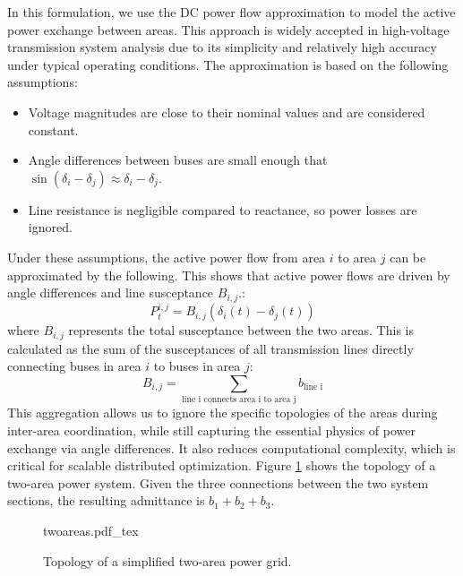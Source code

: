 \documentclass{article}
\newcommand{\incfig}[1]{%
    \def\svgwidth{\columnwidth}
    {#1.pdf_tex}
}
\begin{document}
In this formulation, we use the DC power flow approximation to model the active power exchange between areas. This approach is widely accepted in high-voltage transmission system analysis due to its simplicity and relatively high accuracy under typical operating conditions. The approximation is based on the following assumptions:
\begin{itemize}
    \item Voltage magnitudes are close to their nominal values and are considered constant.
    \item Angle differences between buses are small enough that $\sin(\delta_i - \delta_j) \approx \delta_i - \delta_j$.
    \item Line resistance is negligible compared to reactance, so power losses are ignored.
\end{itemize}
Under these assumptions, the active power flow from area $i$ to area $j$ can be approximated by the following. This shows that active power flows are driven by angle differences and line susceptance $B_{i,j}$.:
\begin{equation}
    P^{i,j}_t = B_{i,j}(\delta_i(t) - \delta_j(t))
\end{equation}
where $B_{i,j}$ represents the total susceptance between the two areas. This is calculated as the sum of the susceptances of all transmission lines directly connecting buses in area $i$ to buses in area $j$:
\begin{equation}
    B_{i,j} = \sum_{\text{line i connects area i to area j}} b_{\text{line i}}
\end{equation}
This aggregation allows us to ignore the specific topologies of the areas during inter-area coordination, while still capturing the essential physics of power exchange via angle differences. It also reduces computational complexity, which is critical for scalable distributed optimization. Figure \ref{fig:two_area} shows the topology of a two-area power system. Given the three connections between the two system sections, the resulting admittance is $b_1 + b_2 + b_3$.

\begin{figure}[h]
    \centering
    \incfig{twoareas}
    \caption{Topology of a simplified two-area power grid.}
    \label{fig:two_area}
\end{figure}
\end{document}
